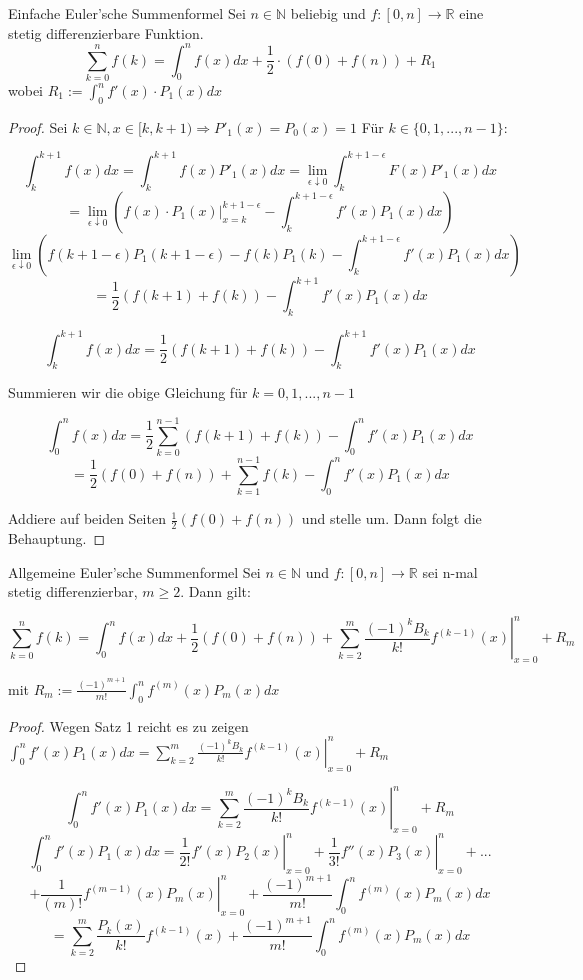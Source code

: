 \documentclass[12pt]{article}
\begin{document}
\begin{theorem}{Einfache Euler'sche Summenformel}
Sei \(n\in\mathbb{N}\) beliebig und \(f : [0, n] \to \mathbb{R}\) eine stetig differenzierbare Funktion.
\[\sum_{k=0}^n f(k) = \int_0^n f(x) dx + \frac{1}{2} \cdot (f(0) + f(n)) + R_1\]
wobei \(R_1 := \int_0^n f'(x) \cdot P_1(x) dx\)
\end{theorem}
\begin{proof}
Sei \(k \in \mathbb{N}, x \in [k, k+1) \Longrightarrow P'_1(x) = P_0(x) = 1\)
Für \(k \in \{ 0, 1, ..., n-1 \}\):

\[\int_k^{k+1} f(x) dx = \int_k^{k+1} f(x) P'_1(x) dx = \lim_{\epsilon \downarrow 0} \int_k^{k+1-\epsilon} F(x) P'_1(x) dx\]
\[= \lim_{\epsilon \downarrow 0} \left(\left. f(x) \cdot P_1(x) \right|_{x=k}^{k+1-\epsilon} - \int_k^{k+1-\epsilon} f'(x) P_1(x) dx \right) \] %
\[\lim_{\epsilon \downarrow 0} \left(f(k+1-\epsilon)P_1(k+1-\epsilon) -  f(k)P_1(k) - \int_k^{k+1-\epsilon} f'(x) P_1(x) dx \right)\]
\[ = \frac{1}{2}(f(k+1)+f(k)) - \int_k^{k+1} f'(x) P_1(x) dx\]

\[\int_k^{k+1} f(x) dx = \frac{1}{2}(f(k+1)+f(k)) - \int_k^{k+1} f'(x) P_1(x) dx\]

Summieren wir die obige Gleichung für \(k = 0, 1, ..., n-1\)

\[\int_0^n f(x) dx = \frac{1}{2} \sum_{k=0}^{n-1} \left(f(k+1) + f(k)\right) - \int_0^n f'(x) P_1(x) dx\]
\[= \frac{1}{2}(f(0) + f(n)) + \sum_{k=1}^{n-1} f(k) - \int_0^n f'(x) P_1(x) dx\]

Addiere auf beiden Seiten \(\frac{1}{2}(f(0) + f(n))\) und stelle um. Dann folgt die Behauptung.
\end{proof}

\begin{theorem}{Allgemeine Euler'sche Summenformel}
Sei \(n \in \mathbb{N}\) und \(f : [0, n] \to \mathbb{R}\) sei n-mal stetig differenzierbar, \(m \geq 2\). Dann gilt:

\[\sum_{k=0}^n f(k) = \int_0^n f(x) dx + \frac{1}{2}(f(0)+f(n)) + \sum_{k=2}^m \left. \frac{(-1)^k B_k}{k!} f^{(k-1)} (x) \right|_{x=0}^n + R_m\]

mit \(R_m := \frac{(-1)^{m+1}}{m!} \int_0^n f^{(m)}(x) P_m(x) dx\)
\end{theorem}
\begin{proof}
Wegen Satz 1 reicht es zu zeigen \(\int_0^n f'(x) P_1(x) dx = \sum_{k=2}^m \left. \frac{(-1)^k B_k}{k!} f^{(k-1)}(x) \right|_{x=0}^n + R_m\)

\[\int_0^n f'(x) P_1(x) dx = \sum_{k=2}^m \left. \frac{(-1)^k B_k}{k!} f^{(k-1)}(x) \right|_{x=0}^n + R_m\]
\[\int_0^n f'(x) P_1(x) dx = \left. \frac{1}{2!} f'(x) P_2(x) \right|_{x=0}^n + \left. \frac{1}{3!} f''(x) P_3(x) \right|_{x=0}^n + ...\]\[ + \left. \frac{1}{(m)!} f^{(m-1)}(x) P_{m}(x) \right|_{x=0}^n + \frac{(-1)^{m+1}}{m!} \int_0^n f^{(m)}(x) P_m(x) dx \]
\[ = \sum_{k=2}^m \frac{P_{k}(x)}{k!} f^{(k-1)}(x) + \frac{(-1)^{m+1}}{m!} \int_0^n f^{(m)}(x) P_m(x) dx \]
\end{proof}
\end{document}
